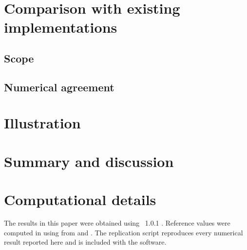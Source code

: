 \documentclass[article]{jss}
\begin{document}
\section{Comparison with existing implementations} \label{sec:comparison}


\subsection{Scope}


\subsection{Numerical agreement}


\section{Illustration} \label{sec:illustration}


\section{Summary and discussion} \label{sec:summary}


\section*{Computational details}

The results in this paper were obtained using ~1.0.1
\citep{pcapro}. Reference values were computed in  using
 from  \citep{R} and  \citep{psych}.
The replication script  reproduces every numerical
result reported here and is included with the software.


\end{document}
